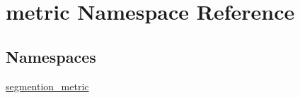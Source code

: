 \hypertarget{namespacemetric}{}\section{metric Namespace Reference}
\label{namespacemetric}
\subsection*{Namespaces}
\begin{DoxyCompactItemize}
\item 
 \mbox{\hyperlink{namespacemetric_1_1segmention__metric}{segmention\+\_\+metric}}
\end{DoxyCompactItemize}
